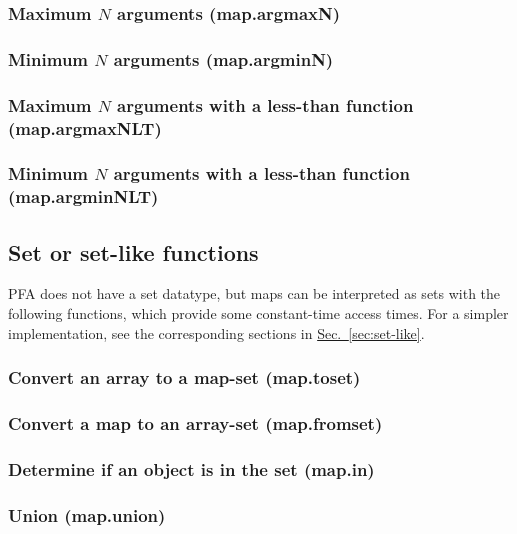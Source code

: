 \documentclass{article}
\theoremstyle{definition}
\begin{document}
\subsubsection{Maximum $N$ arguments (map.argmaxN)}

\subsubsection{Minimum $N$ arguments (map.argminN)}

\subsubsection{Maximum $N$ arguments with a less-than function (map.argmaxNLT)}

\subsubsection{Minimum $N$ arguments with a less-than function (map.argminNLT)}

\hypertarget{hsec:set-like-map}{}
\subsection{Set or set-like functions}
\label{sec:set-like-map}

PFA does not have a set datatype, but maps can be interpreted as sets with the following functions, which provide some constant-time access times.  For a simpler implementation, see the corresponding sections in \hyperlink{hsec:set-like}{Sec.~\ref{sec:set-like}}.

\subsubsection{Convert an array to a map-set (map.toset)}

\subsubsection{Convert a map to an array-set (map.fromset)}

\subsubsection{Determine if an object is in the set (map.in)}

\subsubsection{Union (map.union)}
\end{document}
